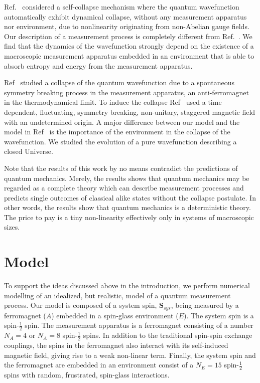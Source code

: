 \documentclass[showpacs,preprintnumbers,amsmath,amssymb,12pt]{revtex4-2}
\begin{document}
Ref.~\cite{Hanson:quant-ph2000} considered a self-collapse mechanism
where the quantum wavefunction automatically exhibit dynamical
collapse, without any measurement apparatus nor environment, due to
nonlinearity originating from non-Abelian gauge fields. Our
description of a measurement process is completely different from
Ref.~\cite{Hanson:quant-ph2000}. We find that the dynamics of the
wavefunction strongly depend on the existence of a macroscopic
measurement apparatus embedded in an environment that is able to
absorb entropy and energy from the measurement apparatus.

Ref~\cite{wezel} studied a collapse of the quantum
wavefunction due to a spontaneous symmetry breaking process in the
measurement apparatus, an anti-ferromagnet in the thermodynamical
limit. To induce the collapse Ref~\cite{wezel} used a time
dependent, fluctuating, symmetry breaking, non-unitary, staggered
magnetic field with an undetermined origin.  A major difference
between our model and the model in Ref~\cite{wezel} is the
importance of the environment in the collapse of the wavefunction. We
studied the evolution of a pure wavefunction describing a closed
Universe.

Note that the results of this work by no means contradict the
predictions of quantum mechanics. Merely, the results shows that
quantum mechanics may be regarded as a complete theory which can
describe measurement processes and predicts single outcomes of
classical alike states without the collapse postulate. In other words,
the results show that quantum mechanics is a deterministic theory. The
price to pay is a tiny non-linearity effectively only in systems of
macroscopic sizes.


\section{Model}
To support the ideas discussed above in the introduction, we perform
numerical modelling of an idealized, but realistic, model of a quantum
measurement process. Our model is composed of a system spin,
$\boldsymbol{S}_{sys}$, being measured by a ferromagnet ($A$) embedded
in a spin-glass environment ($E$). The system spin is a
spin-$\frac{1}{2}$ spin. The measurement apparatus is a ferromagnet
consisting of a number $N_A=4$ or $N_A=8$ spin-$\frac{1}{2}$ spins. In
addition to the traditional spin-spin exchange couplings, the spins in
the ferromagnet also interact with its self-induced magnetic field,
giving rise to a weak non-linear term. Finally, the system spin and
the ferromagnet are embedded in an environment consist of a $N_E = 15$
spin-$\frac{1}{2}$ spins with random, frustrated, spin-glass
interactions.
\end{document}

